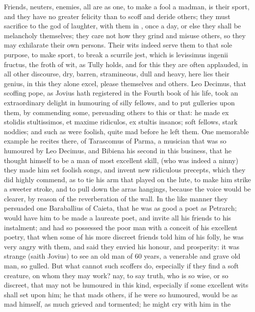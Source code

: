 {{Friends, neuters, enemies, all are as one, to make a fool a madman, is
their sport, and they have no greater felicity than to scoff and deride
others; they must sacrifice to the god of laughter, with them in 
\Apuleius, once a day, or else they shall be melancholy themselves; they
care not how they grind and misuse others, so they may exhilarate their
own persons. Their wits indeed serve them to that sole purpose, to make
sport, to break a scurrile jest, which is levissimus ingenii fructus,
the froth of wit, as Tully holds, and for this they are often
applauded, in all other discourse, dry, barren, stramineous, dull and
heavy, here lies their genius, in this they alone excel, please
themselves and others. Leo Decimus, that scoffing pope, as Jovius hath
registered in the Fourth book of his life, took an extraordinary
delight in humouring of silly fellows, and to put gulleries upon them,
by commending some, persuading others to this or that: he made ex
stolidis stultissimos, et maxime ridiculos, ex stultis insanos; soft
fellows, stark noddies; and such as were foolish, quite mad before he
left them. One memorable example he recites there, of Tarascomus of
Parma, a musician that was so humoured by Leo Decimus, and Bibiena his
second in this business, that he thought himself to be a man of most
excellent skill, (who was indeed a ninny) they made him set
foolish songs, and invent new ridiculous precepts, which they did
highly commend, as to tie his arm that played on the lute, to make him
strike a sweeter stroke, and to pull down the arras hangings,
because the voice would be clearer, by reason of the reverberation of
the wall. In the like manner they persuaded one Baraballius of Caieta,
that he was as good a poet as Petrarch; would have him to be made a
laureate poet, and invite all his friends to his instalment; and had so
possessed the poor man with a conceit of his excellent poetry, that
when some of his more discreet friends told him of his folly, he was
very angry with them, and said they envied his honour, and
prosperity: it was strange (saith Jovius) to see an old man of 60
years, a venerable and grave old man, so gulled. But what cannot such
scoffers do, especially if they find a soft creature, on whom they may
work? nay, to say truth, who is so wise, or so discreet, that may not
be humoured in this kind, especially if some excellent wits shall set
upon him; he that mads others, if he were so humoured, would be as mad
himself, as much grieved and tormented; he might cry with him in the
}}
